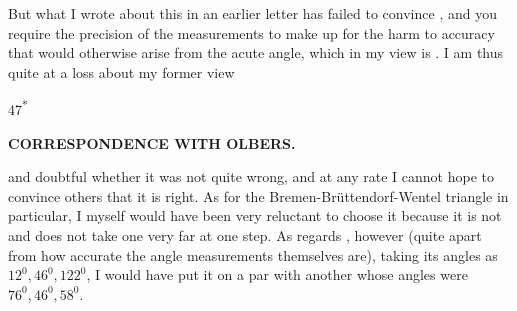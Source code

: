 \par\noindent\hspace*{\parindent}But what I wrote about this in an earlier letter has failed to convince
, and you require the precision of the measurements to make up for
the harm to accuracy that would otherwise arise from the acute angle, which
in my view is . I am thus quite at a loss about my former view
\par\smallskip\noindent\hfill{\footnotesize 47\textsuperscript{*}}\par
\clearpage
{}\hfill{\small\textbf{CORRESPONDENCE WITH OLBERS.}}\par\medskip
\noindent and doubtful whether it was not quite wrong, and at any rate I cannot
hope to convince others that it is right. As for the Bremen-Brüttendorf-Wentel
triangle in particular, I myself would have been very reluctant to choose it
because it is not  and does not take one very far at one step.
As regards , however (quite apart from how accurate the angle
measurements themselves are), taking its angles as \(12^{0},46^{0},122^{0}\), I
would have put it  on a par with another whose angles were
\(76^{0},46^{0},58^{0}\).
